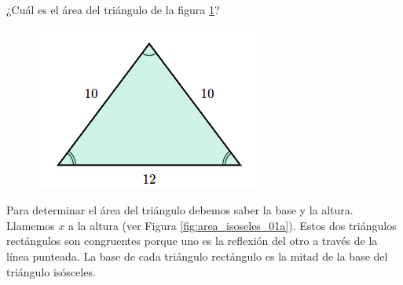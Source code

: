 ¿Cuál es el \'area del triángulo de la figura \ref{fig:area_isoseles_01}?

\begin{figure}[H]
    \centering
    \includegraphics[width=0.3\linewidth]{../images/area_isoseles_01.png}
    \caption{}
    \label{fig:area_isoseles_01}
\end{figure}
\begin{solutionbox}{15cm}

    \begin{minipage}{0.6\textwidth}
        Para determinar el área del triángulo debemos saber la base y la altura. Llamemos $x$ a la altura (ver Figura \ref{fig:area_isoseles_01a}).
        Estos dos triángulos rectángulos son congruentes porque uno es la reflexión del otro a través de la línea punteada.
        La base de cada triángulo rectángulo es la mitad de la base del triángulo isósceles.


\end{minipage}
\end{solutionbox}
